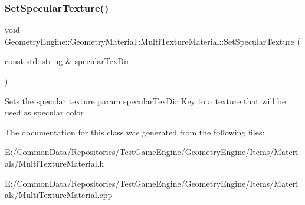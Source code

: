 \subsubsection{\texorpdfstring{SetSpecularTexture()}{SetSpecularTexture()}}
{\footnotesize\ttfamily void Geometry\+Engine\+::\+Geometry\+Material\+::\+Multi\+Texture\+Material\+::\+Set\+Specular\+Texture (\begin{DoxyParamCaption}\item[{const std\+::string \&}]{specular\+Tex\+Dir }\end{DoxyParamCaption})}

Sets the specular texture param specular\+Tex\+Dir Key to a texture that will be used as specular color 

The documentation for this class was generated from the following files\+:\begin{DoxyCompactItemize}
\item 
E\+:/\+Common\+Data/\+Repositories/\+Test\+Game\+Engine/\+Geometry\+Engine/\+Items/\+Materials/Multi\+Texture\+Material.\+h\item 
E\+:/\+Common\+Data/\+Repositories/\+Test\+Game\+Engine/\+Geometry\+Engine/\+Items/\+Materials/Multi\+Texture\+Material.\+cpp\end{DoxyCompactItemize}
